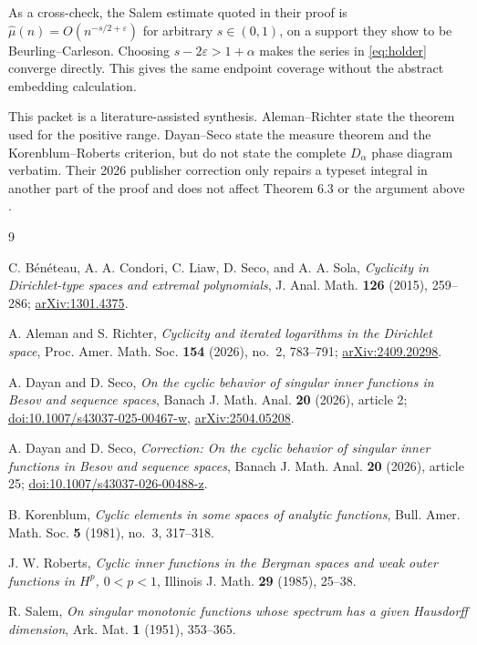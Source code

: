 \documentclass[11pt]{article}
\begin{document}
As a cross-check, the Salem estimate quoted in their proof is
$\widehat\mu(n)=O(n^{-s/2+\varepsilon})$ for arbitrary $s\in(0,1)$, on a
support they show to be Beurling--Carleson.  Choosing
$s-2\varepsilon>1+\alpha$ makes the series in \eqref{eq:holder} converge
directly.  This gives the same endpoint coverage without the abstract
embedding calculation.

This packet is a literature-assisted synthesis.  Aleman--Richter state the
theorem used for the positive range.  Dayan--Seco state the measure theorem
and the Korenblum--Roberts criterion, but do not state the complete
$D_\alpha$ phase diagram verbatim.  Their 2026 publisher correction only
repairs a typeset integral in another part of the proof and does not affect
Theorem 6.3 or the argument above \cite{DScorr}.

\begin{thebibliography}{9}

C. B\'en\'eteau, A. A. Condori, C. Liaw, D. Seco, and A. A. Sola,
\emph{Cyclicity in Dirichlet-type spaces and extremal polynomials},
J. Anal. Math. \textbf{126} (2015), 259--286;
\href{https://arxiv.org/abs/1301.4375}{arXiv:1301.4375}.

A. Aleman and S. Richter,
\emph{Cyclicity and iterated logarithms in the Dirichlet space},
Proc. Amer. Math. Soc. \textbf{154} (2026), no.~2, 783--791;
\href{https://arxiv.org/abs/2409.20298}{arXiv:2409.20298}.

A. Dayan and D. Seco,
\emph{On the cyclic behavior of singular inner functions in Besov and
sequence spaces},
Banach J. Math. Anal. \textbf{20} (2026), article 2;
\href{https://doi.org/10.1007/s43037-025-00467-w}{doi:10.1007/s43037-025-00467-w},
\href{https://arxiv.org/abs/2504.05208}{arXiv:2504.05208}.

A. Dayan and D. Seco,
\emph{Correction: On the cyclic behavior of singular inner functions in
Besov and sequence spaces},
Banach J. Math. Anal. \textbf{20} (2026), article 25;
\href{https://doi.org/10.1007/s43037-026-00488-z}{doi:10.1007/s43037-026-00488-z}.

B. Korenblum,
\emph{Cyclic elements in some spaces of analytic functions},
Bull. Amer. Math. Soc. \textbf{5} (1981), no.~3, 317--318.

J. W. Roberts,
\emph{Cyclic inner functions in the Bergman spaces and weak outer functions
in $H^p$, $0<p<1$},
Illinois J. Math. \textbf{29} (1985), 25--38.

R. Salem,
\emph{On singular monotonic functions whose spectrum has a given Hausdorff
dimension}, Ark. Mat. \textbf{1} (1951), 353--365.

\end{thebibliography}
\end{document}

